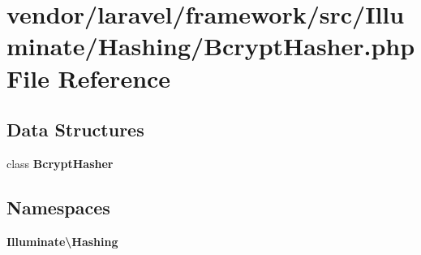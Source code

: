 \section{vendor/laravel/framework/src/\+Illuminate/\+Hashing/\+Bcrypt\+Hasher.php File Reference}
\label{_bcrypt_hasher_8php}
\subsection*{Data Structures}
\begin{DoxyCompactItemize}
\item 
class {\bf Bcrypt\+Hasher}
\end{DoxyCompactItemize}
\subsection*{Namespaces}
\begin{DoxyCompactItemize}
\item 
 {\bf Illuminate\textbackslash{}\+Hashing}
\end{DoxyCompactItemize}
